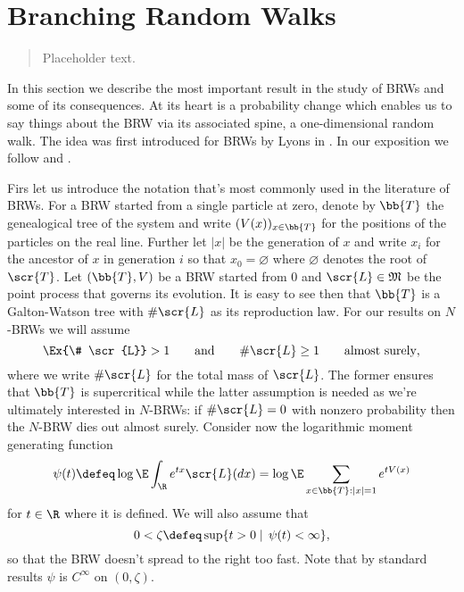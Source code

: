 \section{Branching Random Walks}

\begin{quote}
{\small Placeholder text. }
\end{quote}

In this section we describe the most important result in the study of BRWs and some of its consequences. At its heart is a probability change which enables us to say things about the BRW via its associated spine, a one-dimensional random walk. The idea was first introduced for BRWs by Lyons in \cite{lyons1997simple}. In our exposition we follow \cite{mallein2018n} and \cite[Section 4.7]{shi2015branching}. 

Firs let us introduce the notation that's most commonly used in the literature of BRWs. For a BRW started from a single particle at zero, denote by $\bb{T}$ the genealogical tree of the system and write $(V(x))_{x \in \bb{T}}$ for the positions of the particles on the real line. Further let $|x|$ be the generation of $x$ and write $x_i$ for the ancestor of $x$ in generation $i$ so that $x_0 = \varnothing$ where $\varnothing$ denotes the root of $\scr{T}$. Let $(\bb{T}, V)$ be a BRW started from $0$ and $\scr{L} \in \frak{M}$ be the point process that governs its evolution. It is easy to see then that $\bb{T}$ is a Galton-Watson tree with $\# \scr{L}$ as its reproduction law. For our results on $N$-BRWs we will assume 
\begin{equation}\label{eqn:TreeAssumptions}
\Ex{\# \scr{L}} > 1 \qquad\text{and}\qquad \# \scr{L} \geq 1 \qquad \text{almost surely},  
\end{equation}
where we write $\# \scr{L}$ for the total mass of $\scr{L}$. The former ensures that $\bb{T}$ is supercritical while the latter assumption is needed as we're ultimately interested in $N$-BRWs: if $\# \scr{L} = 0$ with nonzero probability then the $N$-BRW dies out almost surely. Consider now the logarithmic moment generating function
\begin{equation}
\psi(t) \defeq \log \E \int_\R e^{t x} \scr{L}(dx) = \log \E \sum\limits_{x \in \bb{T}: |x|=1} e^{t V(x)} 
\end{equation}
for $t \in \R$ where it is defined. We will also assume that 
\begin{equation}\label{eqn:BRW_generator_finite}
0 < \zeta \defeq \sup\{ t > 0 \mid\, \psi(t) < \infty \}, 
\end{equation}
so that the BRW doesn't spread to the right too fast. Note that by standard results $\psi$ is $C^\infty$ on $(0, \zeta)$. 





